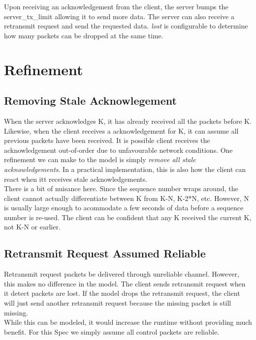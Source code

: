 Upon receiving an acknowledgement from the client, the server bumps the
server\_tx\_limit allowing it to send more data. The server can also receive a 
retransmit request and send the requested data. \textit{lost} is configurable to
determine how many packets can be dropped at the same time.

\section{Refinement}

\subsection{Removing Stale Acknowlegement}

When the server acknowledges K, it has already received all the packets before
K. Likewise, when the client receives a acknowledgement for K, it can assume all
previous packets have been received. It is possible client receives the
acknowledgement out-of-order due to unfavourable network conditions. One
refinement we can make to the model is simply \textit{remove all stale
acknowledgements}. In a practical implementation, this is also how the client
can react when itt receives stale acknowledgements.\\

There is a bit of nuisance here. Since the sequence number wraps around, the
client cannot actually differentiate between K from K-N, K-2*N, etc. However, N
is usually large enough to acommodate a few seconds of data before a sequence
number is re-used. The client can be confident that any K received the current
K, not K-N or earlier.

\subsection{Retransmit Request Assumed Reliable}

Retransmit request packets be delivered through unreliable
channel. However, this makes no difference in the model. The client sends
retransmit request when it detect packets are lost. If the model drops the
retransmit request, the client will just send another retransmit request because
the missing packet is still missing.\\

While this can be modeled, it would increase the runtime without providing much 
benefit. For this Spec we simply assume all control packets are reliable. 


